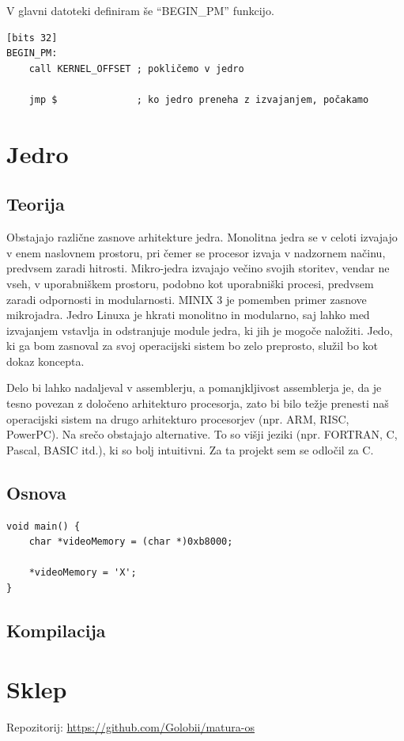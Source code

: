 \documentclass{report}
\begin{document}
V glavni datoteki definiram še ``BEGIN\_PM'' funkcijo.
\begin{verbatim}
[bits 32]
BEGIN_PM:
    call KERNEL_OFFSET ; pokličemo v jedro

    jmp $              ; ko jedro preneha z izvajanjem, počakamo
\end{verbatim}


\chapter{Jedro}

\section{Teorija}
Obstajajo različne zasnove arhitekture jedra. Monolitna jedra se v celoti
izvajajo v enem naslovnem prostoru, pri čemer se procesor izvaja v nadzornem
načinu, predvsem zaradi hitrosti. Mikro-jedra izvajajo večino svojih storitev,
vendar ne vseh, v uporabniškem prostoru, podobno kot uporabniški procesi,
predvsem zaradi odpornosti in modularnosti. MINIX 3 je pomemben primer zasnove
mikrojadra. Jedro Linuxa je hkrati monolitno in modularno, saj lahko med
izvajanjem vstavlja in odstranjuje module jedra, ki jih je mogoče naložiti.
Jedo, ki ga bom zasnoval za svoj operacijski sistem bo zelo preprosto, služil bo
kot dokaz koncepta.

Delo bi lahko nadaljeval v assemblerju, a pomanjkljivost assemblerja je, da je
tesno povezan z določeno arhitekturo procesorja, zato bi bilo težje prenesti
naš operacijski sistem na drugo arhitekturo procesorjev (npr. ARM, RISC, PowerPC).
Na srečo obstajajo alternative. To so višji jeziki (npr. FORTRAN, C, Pascal,
BASIC itd.), ki so bolj intuitivni. Za ta projekt sem se odločil za C. 

\section{Osnova}

\begin{verbatim}
void main() {
    char *videoMemory = (char *)0xb8000;

    *videoMemory = 'X';
}
\end{verbatim}

\section{Kompilacija}

\chapter{Sklep}
Repozitorij: \url{https://github.com/Golobii/matura-os}

\printbibliography
\end{document}
